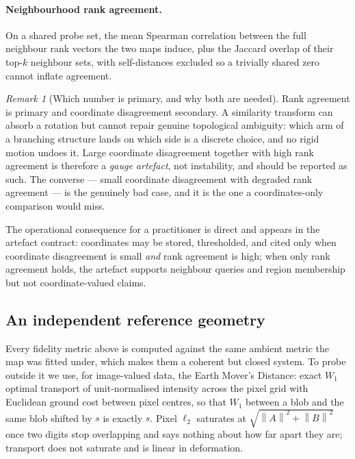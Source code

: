 \documentclass[12pt]{iopart}
\theoremstyle{definition}
\theoremstyle{plain}
\theoremstyle{remark}
\newtheorem{remark}{Remark}
\newcommand{\norm}[1]{\left\lVert#1\right\rVert}
\begin{document}
\paragraph{Neighbourhood rank agreement.}
On a shared probe set, the mean Spearman correlation between the full neighbour
rank vectors the two maps induce, plus the Jaccard overlap of their top-$k$
neighbour sets, with self-distances excluded so a trivially shared zero cannot
inflate agreement.

\begin{remark}[Which number is primary, and why both are needed]
\label{rem:persprimary}
Rank agreement is primary and coordinate disagreement secondary. A similarity
transform can absorb a rotation but cannot repair genuine topological ambiguity:
which arm of a branching structure lands on which side is a discrete choice, and
no rigid motion undoes it. Large coordinate disagreement together with high rank
agreement is therefore a \emph{gauge artefact}, not instability, and should be
reported as such. The converse --- small coordinate disagreement with degraded
rank agreement --- is the genuinely bad case, and it is the one a
coordinates-only comparison would miss.
\end{remark}

The operational consequence for a practitioner is direct and appears in the
artefact contract: coordinates may be stored, thresholded, and cited only when
coordinate disagreement is small \emph{and} rank agreement is high; when only
rank agreement holds, the artefact supports neighbour queries and region
membership but not coordinate-valued claims.

\subsection{An independent reference geometry}
\label{sec:emd}

Every fidelity metric above is computed against the same ambient metric the map
was fitted under, which makes them a coherent but closed system. To probe
outside it we use, for image-valued data, the Earth Mover's Distance: exact
$W_1$ optimal transport of unit-normalised intensity across the pixel grid with
Euclidean ground cost between pixel centres, so that $W_1$ between a blob and
the same blob shifted by $s$ is exactly $s$. Pixel $\ell_2$ saturates at
$\sqrt{\norm{A}^2+\norm{B}^2}$ once two digits stop overlapping and says
nothing about how far apart they are; transport does not saturate and is linear
in deformation.
\end{document}
